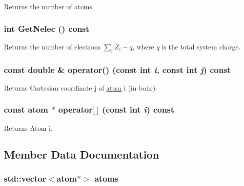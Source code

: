 Returns the number of atoms. \hypertarget{classJKBuilder_1_1molecule__class_aeb29d9144c99d302f7b43d5398929ea5}{
\subsubsection[{GetNelec}]{\setlength{\rightskip}{0pt plus 5cm}int GetNelec () const}}
\label{classJKBuilder_1_1molecule__class_aeb29d9144c99d302f7b43d5398929ea5}


Returns the number of electrons $\sum_i Z_i-q$, where $q$ is the total system charge. \hypertarget{classJKBuilder_1_1molecule__class_a9ccbac42f4eefb704f04886001f4fb3e}{
\subsubsection[{operator()}]{\setlength{\rightskip}{0pt plus 5cm}const double \& operator() (const int {\em i}, \/  const int {\em j}) const}}
\label{classJKBuilder_1_1molecule__class_a9ccbac42f4eefb704f04886001f4fb3e}


Returns Cartesian coordinate j of \hyperlink{classJKBuilder_1_1atom}{atom} i (in bohr). \hypertarget{classJKBuilder_1_1molecule__class_a8a54a3b159b0eb733c877569b32f13e3}{
\subsubsection[{operator[]}]{\setlength{\rightskip}{0pt plus 5cm}const {\bf atom} $\ast$ operator\mbox{[}$\,$\mbox{]} (const int {\em i}) const}}
\label{classJKBuilder_1_1molecule__class_a8a54a3b159b0eb733c877569b32f13e3}


Returns Atom i. 

\subsection{Member Data Documentation}
\hypertarget{classJKBuilder_1_1molecule__class_a88ab0e266efe1ae93e6005501b372c76}{
\subsubsection[{atoms}]{\setlength{\rightskip}{0pt plus 5cm}std::vector$<${\bf atom}$\ast$$>$ {\bf atoms}}}
\label{classJKBuilder_1_1molecule__class_a88ab0e266efe1ae93e6005501b372c76}


